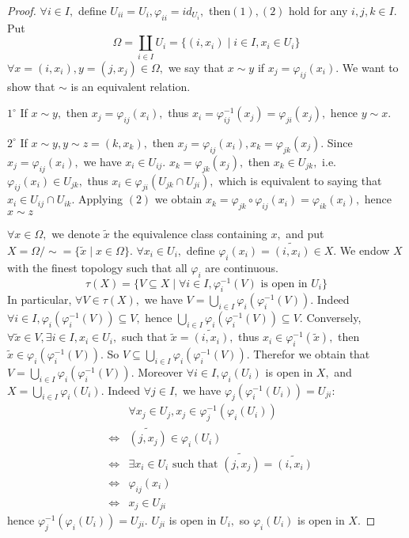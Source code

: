 \begin{proof}
$\forall i\in I,$ define $U_{ii}=U_i, \varphi_{ii}=id_{U_i},$
then$(1),(2)$ hold for any $i,j,k\in I.$
Put$$\Omega=\coprod\limits_{i\in I}U_i=\{(i,x_i)\mid i\in I, x_i\in
U_i\}$$ $\forall x=(i, x_i), y=(j, x_j)\in\Omega,$ we say that
$x\sim y$ if $x_j=\varphi_{ij}(x_i).$ We want to show that $\sim$ is
an equivalent relation.

$\mathit{1^{\circ}}$ If $x\sim y,$ then $x_j=\varphi_{ij}(x_i),$
thus $x_i=\varphi^{-1}_{ij}(x_j)=\varphi_{ji}(x_j),$ hence $y\sim
x.$

$\mathit{2^{\circ}}$ If $x\sim y, y\sim z=(k,x_k),$ then
$x_j=\varphi_{ij}(x_i), x_k=\varphi_{jk}(x_j).$ Since
$x_j=\varphi_{ij}(x_i),$ we have $x_i\in U_{ij}.$
$x_k=\varphi_{jk}(x_j),$ then $x_k\in U_{jk},$ i.e.
$\varphi_{ij}(x_i)\in U_{jk},$ thus $x_i\in\varphi_{ji}(U_{jk}\cap
U_{ji}),$ which is equivalent to saying that $x_i\in U_{ij}\cap
U_{ik}.$ Applying $(2)$ we obtain
$x_k=\varphi_{jk}\circ\varphi_{ij}(x_i)=\varphi_{ik}(x_i),$ hence
$x\sim z$

$\forall x\in\Omega,$ we denote $\widetilde{x}$ the equivalence
class containing $x,$ and put $X=\Omega/\sim=\{\widetilde{x}\mid
x\in\Omega\}.$ $\forall x_i\in U_i,$ define
$\varphi_i(x_i)=\widetilde{(i, x_i)}\in X.$ We endow $X$ with the
finest topology such that all $\varphi_i$ are continuous.
$$\tau(X)=\{V\subseteq X\mid\forall i\in I, \varphi_i^{-1}(V) \text{ is open in }
U_i\}$$ In particular, $\forall V\in\tau(X),$ we have
$V=\bigcup\limits_{i\in I}\varphi_i(\varphi_i^{-1}(V)).$ Indeed
$\forall i\in I, \varphi_i(\varphi_i^{-1}(V))\subseteq V,$ hence
$\bigcup\limits_{i\in I}\varphi_i(\varphi_i^{-1}(V))\subseteq V.$
Conversely, $\forall \widetilde{x}\in V, \exists i\in I, x_i\in
U_i,$ such that $\widetilde{x}=\widetilde{(i,x_i)},$ thus
$x_i\in\varphi_i^{-1}(\widetilde{x}),$ then
$\widetilde{x}\in\varphi_i(\varphi_i^{-1}(V)).$ So $V\subseteq
\bigcup\limits_{i\in I}\varphi_i(\varphi_i^{-1}(V)).$ Therefor we
obtain that $V=\bigcup\limits_{i\in I}\varphi_i(\varphi_i^{-1}(V)).$
Moreover $\forall i\in I, \varphi_i(U_i)$ is open in $X,$ and
$X=\bigcup\limits_{i\in I}\varphi_i(U_i).$ Indeed $\forall j\in I,$
we have $\varphi_j(\varphi_i^{-1}(U_i))=U_{ji}$:
\begin{eqnarray*}
& & \forall x_j\in U_j, x_j\in\varphi^{-1}_j(\varphi_i(U_i)) \\
& \Leftrightarrow & \widetilde{(j, x_j)}\in
\varphi_i(U_i)                                           \\
& \Leftrightarrow & \exists x_i\in U_i \text{ such that }
\widetilde{(j, x_j)}=\widetilde{(i, x_i)}                \\
& \Leftrightarrow & \varphi_{ij}(x_i)                    \\
& \Leftrightarrow & x_j\in U_{ji}
\end{eqnarray*}
hence $\varphi^{-1}_j(\varphi_i(U_i))=U_{ji}.$ $U_{ji}$ is open in
$U_i,$ so $\varphi_i(U_i)$ is open in $X.$


\end{proof}
